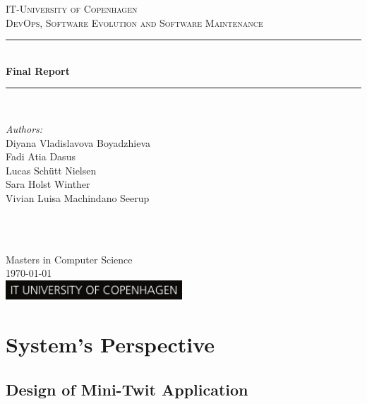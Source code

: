 \documentclass[10pt,a4paper]{article}
\numberwithin{equation}{section}
\begin{document}

\begin{titlepage}

\newcommand{\HRule}{\rule{\linewidth}{0.5mm}} 

\center

\textsc{\LARGE IT-University of Copenhagen}\\[1.5cm] 
\textsc{\Large DevOps, Software Evolution and Software Maintenance}\\[0.5cm]

\HRule \\[0.2cm]
{ \huge \bfseries  Final Report}\\
\HRule \\[1.5cm]
 
\begin{minipage}{0.6\textwidth}
\begin{flushleft} \large
\emph{Authors:} \\ \medskip
Diyana Vladislavova Boyadzhieva\\
Fadi Atia Dasus\\
Lucas Schütt Nielsen\\
Sara Holst Winther\\
Vivian Luisa Machindano Seerup
\end{flushleft}
\end{minipage}
~
\begin{minipage}{0.3\textwidth}
\begin{flushright} \large

\end{flushright}
\end{minipage}\\[1.5cm]


Masters in Computer Science \\
{\large \today}\\[4.5cm] 

\includegraphics[width=250px, keepaspectratio]{ITU_logo_UK.jpg}\\[1cm] 

\end{titlepage}

\tableofcontents
\newpage
\section{System's Perspective}
\subsection{Design of Mini-Twit Application}

\end{document}
